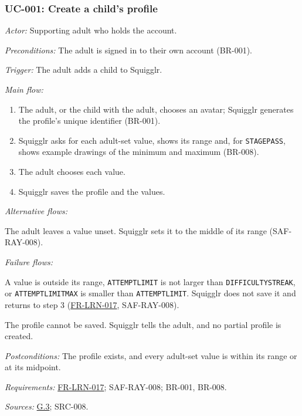 \documentclass[12pt]{article}
\renewcommand{\_}{\textunderscore\allowbreak}%
\newcommand{\goalref}[1]{\hyperref[goal:#1]{G.#1}}
\newcommand{\reqfield}[2]{\noindent\textit{#1:} #2\par}
\newcommand{\reqref}[1]{\hyperref[req:#1]{#1}}
\begin{document}
\subsubsection{UC-001: Create a child's profile}
\label{puc:001}
\reqfield{Actor}{Supporting adult who holds the account.}
\reqfield{Preconditions}{The adult is signed in to their own account (BR-001).}
\reqfield{Trigger}{The adult adds a child to Squigglr.}
\noindent\textit{Main flow:}
\begin{enumerate}[nosep, leftmargin=2.2em]
  \item The adult, or the child with the adult, chooses an avatar; Squigglr
  generates the
  profile's unique identifier (BR-001).
  \item Squigglr asks for each adult-set value, shows its range and, for
  \texttt{STAGE\_PASS}, shows example drawings of the minimum and maximum
  (BR-008).
  \item The adult chooses each value.
  \item Squigglr saves the profile and the values.
\end{enumerate}
\noindent\textit{Alternative flows:}
\begin{description}[nosep, leftmargin=2.2em, font=\normalfont]
  \item[3a.] The adult leaves a value unset. Squigglr sets it to the middle of
  its range (\mbox{SAF-RAY-008}).
\end{description}
\noindent\textit{Failure flows:}
\begin{description}[nosep, leftmargin=2.2em, font=\normalfont]
  \item[3b.] A value is outside its range, \texttt{ATTEMPT\_LIMIT} is not larger
  than \texttt{DIFFICULTY\_STREAK}, or \texttt{ATTEMPT\_LIMIT\_MAX} is smaller
  than \texttt{ATTEMPT\_LIMIT}. Squigglr does not save it and returns to step 3
  (\mbox{\reqref{FR-LRN-017}}, \mbox{SAF-RAY-008}).
  \item[4a.] The profile cannot be saved. Squigglr tells the adult, and no
  partial profile is created.
\end{description}
\reqfield{Postconditions}{The profile exists, and every adult-set value is
within its range or at its midpoint.}
\reqfield{Requirements}{\mbox{\reqref{FR-LRN-017}}; \mbox{SAF-RAY-008}; BR-001,
BR-008.} \reqfield{Sources}{\goalref{3}; \mbox{SRC-008}.}
\end{document}
